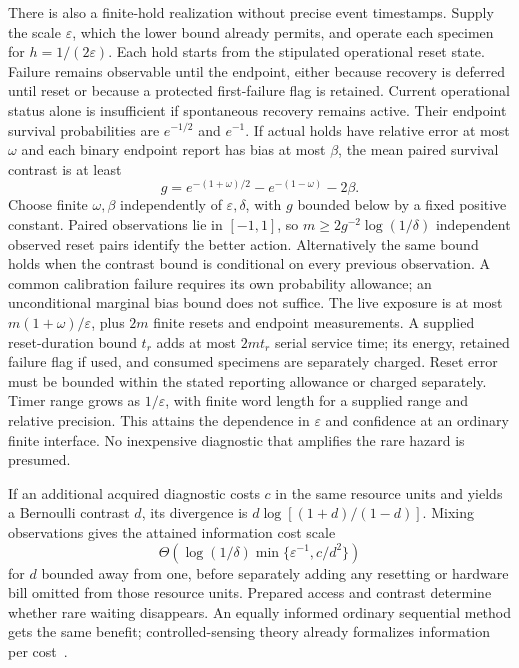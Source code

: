 \documentclass[10pt,a4paper]{article}
\begin{document}
There is also a finite-hold realization without precise event timestamps. Supply the scale $\varepsilon$, which the lower bound already permits, and operate each specimen for $h=1/(2\varepsilon)$. Each hold starts from the stipulated operational reset state. Failure remains observable until the endpoint, either because recovery is deferred until reset or because a protected first-failure flag is retained. Current operational status alone is insufficient if spontaneous recovery remains active. Their endpoint survival probabilities are $e^{-1/2}$ and $e^{-1}$. If actual holds have relative error at most $\omega$ and each binary endpoint report has bias at most $\beta$, the mean paired survival contrast is at least
\[
g=e^{-(1+\omega)/2}-e^{-(1-\omega)}-2\beta.
\]
Choose finite $\omega,\beta$ independently of $\varepsilon,\delta$, with $g$ bounded below by a fixed positive constant. Paired observations lie in $[-1,1]$, so $m\ge2g^{-2}\log(1/\delta)$ independent observed reset pairs identify the better action. Alternatively the same bound holds when the contrast bound is conditional on every previous observation. A common calibration failure requires its own probability allowance; an unconditional marginal bias bound does not suffice. The live exposure is at most $m(1+\omega)/\varepsilon$, plus $2m$ finite resets and endpoint measurements. A supplied reset-duration bound $t_r$ adds at most $2mt_r$ serial service time; its energy, retained failure flag if used, and consumed specimens are separately charged. Reset error must be bounded within the stated reporting allowance or charged separately. Timer range grows as $1/\varepsilon$, with finite word length for a supplied range and relative precision. This attains the dependence in $\varepsilon$ and confidence at an ordinary finite interface. No inexpensive diagnostic that amplifies the rare hazard is presumed.

If an additional acquired diagnostic costs $c$ in the same resource units and yields a Bernoulli contrast $d$, its divergence is $d\log[(1+d)/(1-d)]$. Mixing observations gives the attained information cost scale
\begin{equation}
\Theta\!\left(\log(1/\delta)\min\{\varepsilon^{-1},c/d^2\}\right)
\end{equation}
for $d$ bounded away from one, before separately adding any resetting or hardware bill omitted from those resource units. Prepared access and contrast determine whether rare waiting disappears. An equally informed ordinary sequential method gets the same benefit; controlled-sensing theory already formalizes information per cost~\cite{nitinawarat}.
\end{document}
